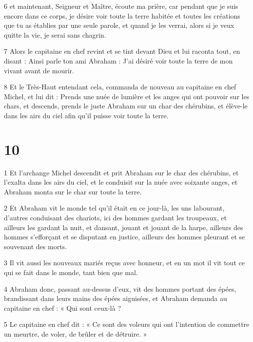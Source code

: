 \par 6 et maintenant, Seigneur et Maître, écoute ma prière, car pendant que je suis encore dans ce corps, je désire voir toute la terre habitée et toutes les créations que tu as établies par une seule parole, et quand je les verrai, alors si je veux quitte la vie, je serai sans chagrin.

\par 7 Alors le capitaine en chef revint et se tint devant Dieu et lui raconta tout, en disant : Ainsi parle ton ami Abraham : J'ai désiré voir toute la terre de mon vivant avant de mourir.

\par 8 Et le Très-Haut entendant cela, commanda de nouveau au capitaine en chef Michel, et lui dit : Prends une nuée de lumière et les anges qui ont pouvoir sur les chars, et descends, prends le juste Abraham sur un char des chérubins, et élève-le dans les airs du ciel afin qu'il puisse voir toute la terre.

\chapter{10}

\par 1 Et l'archange Michel descendit et prit Abraham sur le char des chérubins, et l'exalta dans les airs du ciel, et le conduisit sur la nuée avec soixante anges, et Abraham monta sur le char sur toute la terre.

\par 2 Et Abraham vit le monde tel qu'il était en ce jour-là, les uns labourant, d'autres conduisant des chariots, ici des hommes gardant les troupeaux, et ailleurs les gardant la nuit, et dansant, jouant et jouant de la harpe, ailleurs des hommes s'efforçant et se disputant en justice, ailleurs des hommes pleurant et se souvenant des morts.

\par 3 Il vit aussi les nouveaux mariés reçus avec honneur, et en un mot il vit tout ce qui se fait dans le monde, tant bien que mal.

\par 4 Abraham donc, passant au-dessus d'eux, vit des hommes portant des épées, brandissant dans leurs mains des épées aiguisées, et Abraham demanda au capitaine en chef : « Qui sont ceux-là ?

\par 5 Le capitaine en chef dit : « Ce sont des voleurs qui ont l'intention de commettre un meurtre, de voler, de brûler et de détruire. »

